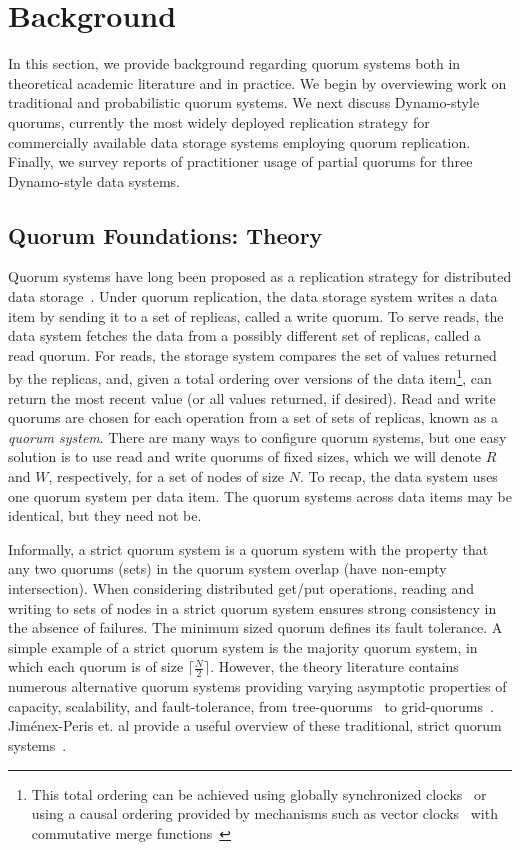 \documentclass{vldb}
\begin{document}
\section{Background}
\label{sec:background}

In this section, we provide background regarding quorum systems both
in theoretical academic literature and in practice.  We begin by
overviewing work on traditional and probabilistic quorum systems.  We
next discuss Dynamo-style quorums, currently the most widely deployed
replication strategy for commercially available data storage systems
employing quorum replication.  Finally, we survey reports of
practitioner usage of partial quorums for three Dynamo-style data
systems.

\subsection{Quorum Foundations: Theory}

Quorum systems have long been proposed as a replication strategy for
distributed data storage~\cite{quorums-start}.  Under quorum
replication, the data storage system writes a data item by sending it
to a set of replicas, called a write quorum.  To serve reads, the data
system fetches the data from a possibly different set of replicas,
called a read quorum.  For reads, the storage system compares the set
of values returned by the replicas, and, given a total ordering over
versions of the data item\footnote{This total ordering can be achieved
  using globally synchronized clocks~\cite{synch-clocks} or using a
  causal ordering provided by mechanisms such as vector
  clocks~\cite{vectorclock} with commutative merge
  functions~\cite{cops}}, can return the most recent value (or all
values returned, if desired).  Read and write quorums are chosen for
each operation from a set of sets of replicas, known as a
\textit{quorum system}.  There are many ways to configure quorum
systems, but one easy solution is to use read and write quorums of
fixed sizes, which we will denote $R$ and $W$, respectively, for a set
of nodes of size $N$.  To recap, the data system uses one quorum
system per data item.  The quorum systems across data items may be
identical, but they need not be.

Informally, a strict quorum system is a quorum system with the
property that any two quorums (sets) in the quorum system overlap
(have non-empty intersection). When considering distributed get/put
operations, reading and writing to sets of nodes in a strict quorum
system ensures strong consistency in the absence of failures.  The
minimum sized quorum defines its fault tolerance.  A simple example of
a strict quorum system is the majority quorum system, in which each
quorum is of size $\lceil \frac{N}{2}\rceil$.  However, the theory
literature contains numerous alternative quorum systems providing
varying asymptotic properties of capacity, scalability, and
fault-tolerance, from tree-quorums~\cite{treequorum} to
grid-quorums~\cite{quorumsystems}.  Jim\'{e}nex-Peris et. al provide a
useful overview of these traditional, strict quorum
systems~\cite{quorums-alternative}.
\end{document}
